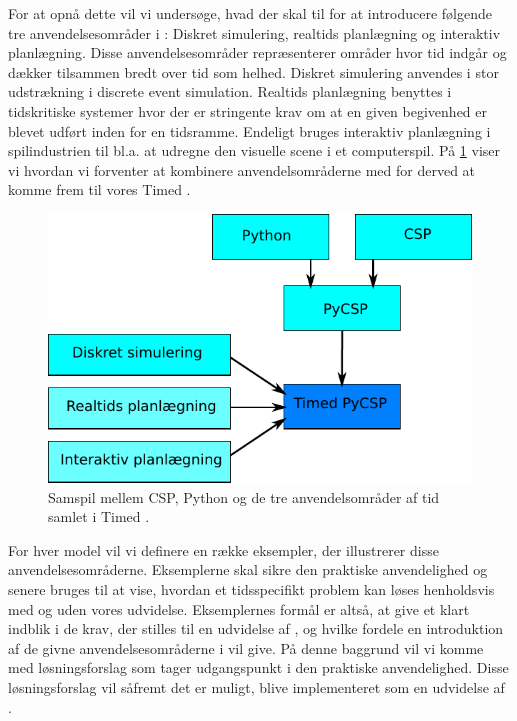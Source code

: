 For at opnå dette vil vi undersøge, hvad der skal til for at introducere følgende tre anvendelsesområder i \pycsp: Diskret simulering, realtids planlægning og interaktiv planlægning. Disse anvendelsesområder repræsenterer områder hvor tid indgår  og dækker tilsammen bredt over tid som helhed. Diskret simulering anvendes i stor udstrækning i discrete event simulation. Realtids planlægning benyttes i tidskritiske systemer hvor der er stringente krav om at en given begivenhed er blevet udført inden for en tidsramme. Endeligt bruges interaktiv planlægning i spilindustrien til bl.a. at udregne den visuelle scene i et computerspil. På \cref{fig:intro} viser vi hvordan vi forventer at kombinere anvendelsområderne med \pycsp for derved at komme frem til vores Timed \pycsp. 

\begin{figure}[htp]
 \begin{center}
  \includegraphics[scale=0.8]{images/intro}
	\caption{Samspil mellem CSP, Python og de tre anvendelsområder af tid samlet i Timed \pycsp .}
	\label{fig:intro}
\end{center}
\end{figure}

For hver model vil vi definere en række eksempler, der illustrerer disse anvendelsesområderne. Eksemplerne skal sikre den praktiske anvendelighed og senere bruges til at vise, hvordan et tidsspecifikt problem kan løses henholdsvis med og uden vores udvidelse. Eksemplernes formål er altså, at give et klart indblik i de krav, der stilles til en udvidelse af \pycsp, og hvilke fordele en introduktion af de givne anvendelsesområderne i \pycsp vil give. På denne baggrund vil vi komme med løsningsforslag som tager udgangspunkt i den praktiske anvendelighed. Disse løsningsforslag vil såfremt det er muligt, blive implementeret som en udvidelse af \pycsp.

